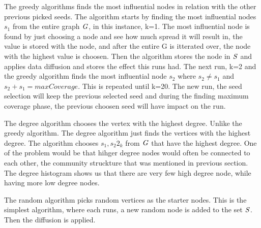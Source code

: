 The greedy algorithms finds the most influential nodes in relation with the other previous picked seeds. The algorithm starts by finding the most influential nodes $s_1$ from the entire graph $\it{G}$, in this instance, k=1. The most influential node is found by just choosing a node and see how much spread it will result in, the value is stored with the node, and after the entire G is itterated over, the node with the highest value is choosen. Then the algorithm stores the node in $\it{S}$ and applies data diffusion and stores the effect this runs had. The next run, k=2 and the greedy algorithm finds the most influential node $s_2$ where $s_2 \neq s_1$ and $s_2 +s_1 = maxCoverage$. This is repeated until k=20. The new run, the seed selection will keep the previous selected seed and during the finding maximum coverage phase, the previous choosen seed will have impact on the run.

The degree algorithm chooses the vertex with the highest degree. Unlike the greedy algorithm. The degree algorithm just finds the vertices with the highest degree. The algorithm chooses $s_1, s_2 \dot 2_k$ from $\it{G}$ that have the highest degree. One of the problem would be that hihger degree nodes would often be connected to each other, the community struckture that was mentioned in previous section. The degree histogram shows us that there are very few high degree node, while having more low degree nodes.

The random algorithm picks random vertices as the starter nodes. This is the simplest algorithm, where each runs, a new random node is added to the set $\it{S}$. Then the diffusion is applied. 

